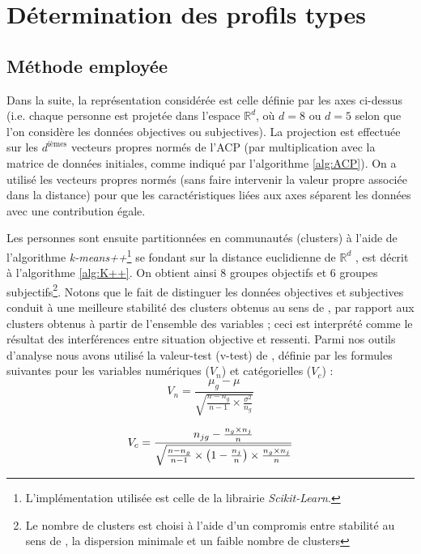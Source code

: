 \documentclass[11pt,fleqn,openany,frenchb]{book} %
\begin{document}
\clearpage

\section{Détermination des profils types}
\subsection{Méthode employée}

Dans la suite, la représentation considérée est celle définie par les axes ci-dessus (i.e. chaque personne est projetée dans l'espace $\mathbb{R}^d$, où $d=8$ ou $d=5$ selon que l'on considère les données objectives ou subjectives). La projection est effectuée sur les $d^{\textrm{ièmes}}$ vecteurs propres normés de l'ACP (par multiplication avec la matrice de données initiales, comme indiqué par l'algorithme \ref{alg:ACP}). On a utilisé les vecteurs propres normés (sans faire intervenir la valeur propre associée dans la distance) pour que les caractéristiques liées aux axes séparent les données avec une contribution égale. 

Les personnes sont ensuite partitionnées en communautés (clusters) à l'aide de l'algorithme \textit{k-means++}\footnote{L'implémentation utilisée est celle de la librairie \textit{Scikit-Learn}.} se fondant sur la distance euclidienne de $\mathbb{R}^d$ \cite{arthur2007k}, est décrit à l'algorithme \ref{alg:K++}.  On obtient ainsi 8 groupes objectifs et 6 groupes subjectifs\footnote{Le nombre de clusters est choisi à l'aide d'un compromis entre stabilité au sens de \cite{meilua2006uniqueness}, la dispersion minimale et un faible nombre de clusters}. Notons que le fait de distinguer les données objectives et subjectives conduit à une meilleure stabilité des clusters obtenus au sens de \cite{meilua2006uniqueness}, par rapport aux clusters obtenus à partir de l'ensemble des variables ; ceci est interprété comme le résultat des interférences entre situation objective et ressenti. Parmi nos outils d'analyse nous avons utilisé la valeur-test (v-test) de \cite{lebart2006statistique}, définie par les formules suivantes pour les variables numériques ($V_n$) et catégorielles ($V_c$) : 
 $$ V_n= \frac{\mu_g-\mu}{\sqrt{\frac{n-n_g}{n-1}\times\frac{\sigma^2}{n_g}}} $$

$$ V_c= \frac{n_{jg}-\frac{n_g\times n_j}{n}}{\sqrt{\frac{n-n_g}{n-1}\times\left( 1-\frac{n_j}{n} \right) \times\frac{n_g\times n_j}{n}}} \vspace{0.2cm}$$
\end{document}
